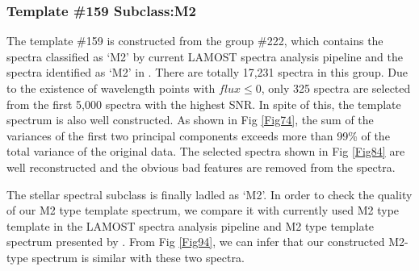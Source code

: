 \documentclass[manuscript]{aastex}
\begin{document}
\subsubsection{Template \#159  Subclass:M2}
The template \#159 is constructed from the group \#222,
which contains the spectra classified as `M2' by current LAMOST spectra analysis pipeline and the spectra identified as `M2' in \cite{yi2013m}.
There are totally 17,231 spectra in this group.
Due to the existence of wavelength points with $flux\le0$, only 325 spectra are selected from the first 5,000 spectra with the highest SNR.
In spite of this, the template spectrum is also well constructed.
As shown in Fig \ref{Fig74}, the sum of the variances of the first two principal components  exceeds more than 99\% of the total variance of the original data.
The selected spectra shown in Fig \ref{Fig84} are  well reconstructed and the obvious bad features are removed from the spectra.



The stellar spectral subclass is finally ladled as `M2'.
In order to check the quality of our M2 type template spectrum,
we compare it with currently used M2 type template in the LAMOST spectra analysis pipeline and
M2 type template spectrum presented by \citet{bochanski2007low}.
From Fig \ref{Fig94}, we can infer that our constructed M2-type spectrum is similar with these two spectra.




%
%
%

\end{document}
